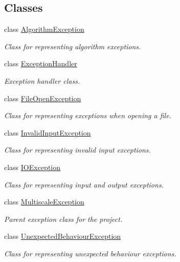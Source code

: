 \subsection*{Classes}
\begin{DoxyCompactItemize}
\item 
class \hyperlink{classmultiscale_1_1AlgorithmException}{Algorithm\-Exception}
\begin{DoxyCompactList}\small\item\em Class for representing algorithm exceptions. \end{DoxyCompactList}\item 
class \hyperlink{classmultiscale_1_1ExceptionHandler}{Exception\-Handler}
\begin{DoxyCompactList}\small\item\em Exception handler class. \end{DoxyCompactList}\item 
class \hyperlink{classmultiscale_1_1FileOpenException}{File\-Open\-Exception}
\begin{DoxyCompactList}\small\item\em Class for representing exceptions when opening a file. \end{DoxyCompactList}\item 
class \hyperlink{classmultiscale_1_1InvalidInputException}{Invalid\-Input\-Exception}
\begin{DoxyCompactList}\small\item\em Class for representing invalid input exceptions. \end{DoxyCompactList}\item 
class \hyperlink{classmultiscale_1_1IOException}{I\-O\-Exception}
\begin{DoxyCompactList}\small\item\em Class for representing input and output exceptions. \end{DoxyCompactList}\item 
class \hyperlink{classmultiscale_1_1MultiscaleException}{Multiscale\-Exception}
\begin{DoxyCompactList}\small\item\em Parent exception class for the project. \end{DoxyCompactList}\item 
class \hyperlink{classmultiscale_1_1UnexpectedBehaviourException}{Unexpected\-Behaviour\-Exception}
\begin{DoxyCompactList}\small\item\em Class for representing unexpected behaviour exceptions. \end{DoxyCompactList}\item 

\end{DoxyCompactItemize}
